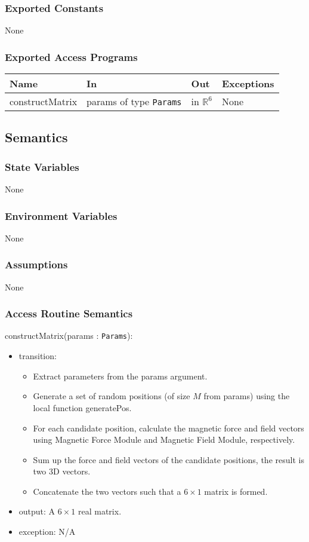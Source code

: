 \documentclass[12pt, titlepage]{article}
\begin{document}
\subsubsection{Exported Constants}
None

\subsubsection{Exported Access Programs}
\begin{center}
\begin{tabular}{p{3cm} p{4cm} p{4cm} p{3cm}}
\hline
\textbf{Name} & \textbf{In} & \textbf{Out} & \textbf{Exceptions} \\
\hline
constructMatrix & params of type \texttt{Params} & in $\mathbb{R}^6$ & None \\
\hline
\end{tabular}
\end{center}

\subsection{Semantics}

\subsubsection{State Variables}
None

\subsubsection{Environment Variables}
None

\subsubsection{Assumptions}
None 

\subsubsection{Access Routine Semantics}

\noindent constructMatrix(params : \texttt{Params}):
\begin{itemize}
\item transition: 
\begin{itemize}
  \item Extract parameters from the params argument. 
  \item Generate a set of random positions (of size $M$ from params) using the local function generatePos.
  \item For each candidate position, calculate the magnetic force and field vectors using Magnetic Force Module and Magnetic Field Module, respectively. 
  \item Sum up the force and field vectors of the candidate positions, the result is two 3D vectors. 
  \item Concatenate the two vectors such that a $6 \times 1$ matrix is formed.
\end{itemize}
\item output: A $6 \times 1$ real matrix. 
\item exception: N/A
\end{itemize}
\end{document}
